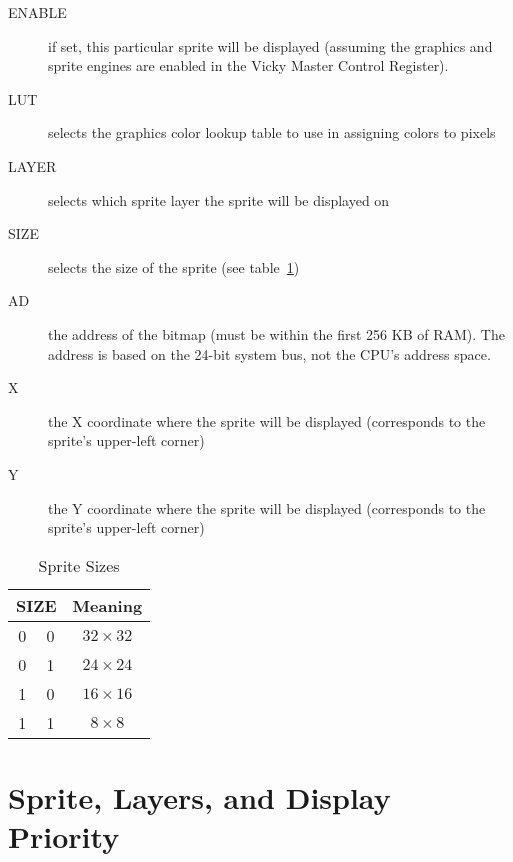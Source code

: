 \begin{description}
    \item[ENABLE] if set, this particular sprite will be displayed (assuming the graphics and sprite engines are enabled in the Vicky Master Control Register).

    \item[LUT] selects the graphics color lookup table to use in assigning colors to pixels

    \item[LAYER] selects which sprite layer the sprite will be displayed on

    \item[SIZE] selects the size of the sprite (see table~\ref{tab:sp_sizes})

    \item[AD] the address of the bitmap (must be within the first 256 KB of RAM). The address is based on the 24-bit system bus, not the CPU's address space.

    \item[X] the X coordinate where the sprite will be displayed (corresponds to the sprite's upper-left corner)

    \item[Y] the Y coordinate where the sprite will be displayed (corresponds to the sprite's upper-left corner)
\end{description}

\begin{table}[h]
    \begin{center}
        \begin{tabular}{|c|c|c|} \hline
            \multicolumn{2}{|c|}{SIZE} & Meaning \\ \hline\hline
            0 & 0 & $32 \times 32$ \\ \hline
            0 & 1 & $24 \times 24$ \\ \hline
            1 & 0 & $16 \times 16$ \\ \hline
            1 & 1 & $8 \times 8$ \\ \hline
        \end{tabular}
    \end{center}
    \caption{Sprite Sizes}
    \label{tab:sp_sizes}
\end{table}

\section{Sprite, Layers, and Display Priority}

